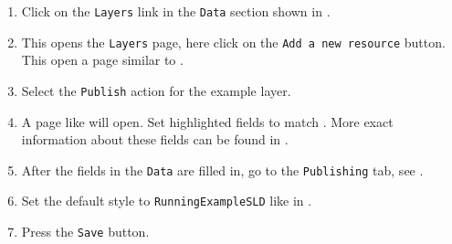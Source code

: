 \begin{minipage}{.45\textwidth}
	\begin{enumerate}[resume]
		\item Click on the \lstinline|Layers| link in the \lstinline|Data| section shown in .
		\item This opens the \lstinline|Layers| page, here click on the \lstinline|Add a new resource| button. This open a page similar to .
		\item Select the \lstinline|Publish| action for the example layer.
		\item A page like  will open. Set highlighted fields to match . More exact information about these fields can be found in .
		\item After the fields in the \lstinline|Data| are filled in, go to the \lstinline|Publishing| tab, see .
		\item Set the  default style to \lstinline|RunningExampleSLD| like in .
		\item Press the \lstinline|Save| button.
	\end{enumerate}
\end{minipage}\hfill
